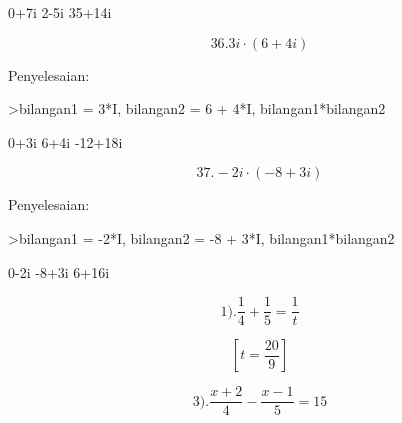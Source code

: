 \documentclass[a4paper,10pt]{article}
\begin{document}
\begin{eulernotebook}
\begin{eulercomment}
\begin{eulercomment}
\begin{eulercomment}
\begin{eulercomment}
\begin{eulercomment}
\begin{eulercomment}
\begin{eulercomment}
\begin{eulercomment}
\begin{eulerprompt}
\end{eulerprompt}
\begin{euleroutput}
  0+7i
  2-5i
  35+14i
\end{euleroutput}
\begin{eulercomment}
\end{eulercomment}
\begin{eulerformula}
\[
36. 3i \cdot (6+4i)
\]
\end{eulerformula}
\begin{eulercomment}
Penyelesaian:

\end{eulercomment}
\begin{eulerprompt}
>bilangan1 = 3*I, bilangan2 = 6 + 4*I, bilangan1*bilangan2
\end{eulerprompt}
\begin{euleroutput}
  0+3i
  6+4i
  -12+18i
\end{euleroutput}
\begin{eulercomment}
\end{eulercomment}
\begin{eulerformula}
\[
37. -2i \cdot (-8+3i)
\]
\end{eulerformula}
\begin{eulercomment}
Penyelesaian:
\end{eulercomment}
\begin{eulerprompt}
>bilangan1 = -2*I, bilangan2 = -8 + 3*I, bilangan1*bilangan2
\end{eulerprompt}
\begin{euleroutput}
  0-2i
  -8+3i
  6+16i
\end{euleroutput}
\begin{eulercomment}
\end{eulercomment}
\begin{eulerformula}
\[
1). \frac{1}{4} + \frac{1}{5} = \frac{1}{t}
\]
\end{eulerformula}
\begin{eulerformula}
\[
\left[ t=\frac{20}{9} \right] 
\]
\end{eulerformula}
\begin{eulercomment}
\end{eulercomment}
\begin{eulerformula}
\[
3). \frac{x+2}{4} - \frac{x-1}{5} = 15
\]
\end{eulerformula}
\begin{eulerprompt}

\end{eulerprompt}
\end{eulercomment}
\end{eulercomment}
\end{eulercomment}
\end{eulercomment}
\end{eulercomment}
\end{eulercomment}
\end{eulercomment}
\end{eulercomment}
\end{eulernotebook}
\end{document}
